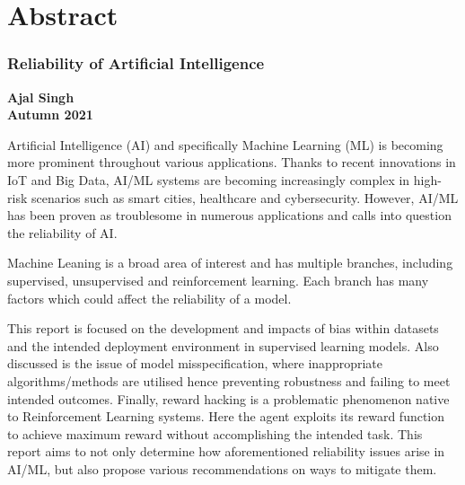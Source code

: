 \thispagestyle{plain}
\pagebreak
\chapter*{Abstract}
\subsection*{\hfill Reliability of Artificial Intelligence \hfill}
\textbf{Ajal Singh}\\
\textbf{Autumn 2021}

Artificial Intelligence (AI) and specifically Machine Learning (ML) is becoming more prominent 
throughout various applications. Thanks to recent innovations in IoT and Big Data, AI/ML systems
are becoming increasingly complex in high-risk scenarios such as smart cities, healthcare and cybersecurity.
However, AI/ML has been proven as troublesome in numerous applications and calls into 
question the reliability of AI.
    
Machine Leaning is a broad area of interest and has multiple branches, including supervised, unsupervised and reinforcement learning.
Each branch has many factors which could affect the reliability of a model.

This report is focused on the development and impacts of bias within datasets and the intended deployment environment in supervised learning models.
Also discussed is the issue of model misspecification, where inappropriate algorithms/methods are utilised hence preventing
robustness and failing to meet intended outcomes. 
Finally, reward hacking is a problematic phenomenon native to Reinforcement Learning systems. 
Here the agent exploits its reward function to achieve maximum reward without accomplishing the intended task.
This report aims to not only determine how aforementioned reliability issues arise in AI/ML, but also propose
various recommendations on ways to mitigate them. 
